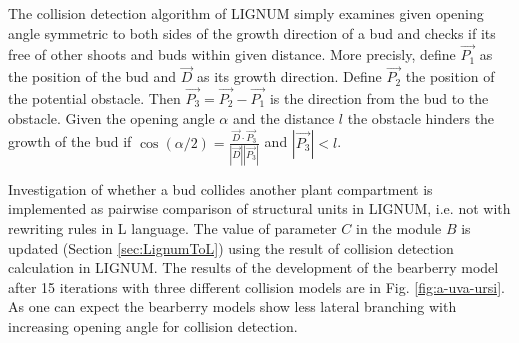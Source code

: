 The  collision detection  algorithm  of LIGNUM  simply examines  given
opening angle symmetric to both sides of the growth direction of a bud
and checks if its free of other shoots and buds within given distance.
More  precisly, define $\vec  {P_1}$ as  the position  of the  bud and
$\vec D$ as its growth  direction. Define $\vec {P_2}$ the position of
the potential obstacle. Then $\vec {P_3} = \vec {P_2} - \vec {P_1}$ is
the direction from  the bud to the obstacle.   Given the opening angle
$\alpha$ and the  distance $l$ the obstacle hinders  the growth of the
bud  if $\cos(\alpha/2) =  \frac{{\vec D}  \cdot {\vec  {P_3}}} {|\vec
D||\vec {P_3}|}$ and $|\vec {P_3}| < l$.

Investigation of  whether a bud collides another  plant compartment is
implemented as pairwise comparison of structural units in LIGNUM, i.e.
not with rewriting rules in L language.  The value of parameter $C$ in
the  module $B$  is  updated (Section  \ref{sec:LignumToL}) using  the
result of  collision detection calculation in LIGNUM.   The results of
the development of the bearberry  model after 15 iterations with three
different collision models are  in Fig.  \ref{fig:a-uva-ursi}.  As one
can  expect the  bearberry  models show  less  lateral branching  with
increasing opening angle for collision detection.
 

















